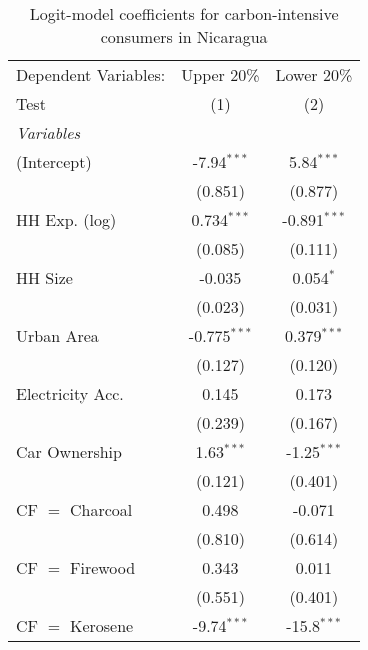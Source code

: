 
\begin{table}[htbp!]
   \centering
   \small
   \begin{adjustbox}{width = 1\textwidth, max height = 0.95\textheight, center}
      \begin{threeparttable}[b]
         \caption{\label{tab:Logit_1_NIC} Logit-model coefficients for carbon-intensive consumers in Nicaragua}
         \begin{tabular}{lcc}
            \tabularnewline \midrule \midrule
            Dependent Variables: & Upper 20\%     & Lower 20\%\\   
            Test                 & (1)            & (2)\\  
            \midrule
            \emph{Variables}\\
            (Intercept)          & -7.94$^{***}$  & 5.84$^{***}$\\   
                                 & (0.851)        & (0.877)\\   
            HH Exp. (log)        & 0.734$^{***}$  & -0.891$^{***}$\\   
                                 & (0.085)        & (0.111)\\   
            HH Size              & -0.035         & 0.054$^{*}$\\   
                                 & (0.023)        & (0.031)\\   
            Urban Area           & -0.775$^{***}$ & 0.379$^{***}$\\   
                                 & (0.127)        & (0.120)\\   
            Electricity Acc.     & 0.145          & 0.173\\   
                                 & (0.239)        & (0.167)\\   
            Car Ownership        & 1.63$^{***}$   & -1.25$^{***}$\\   
                                 & (0.121)        & (0.401)\\   
            CF $=$ Charcoal      & 0.498          & -0.071\\   
                                 & (0.810)        & (0.614)\\   
            CF $=$ Firewood      & 0.343          & 0.011\\   
                                 & (0.551)        & (0.401)\\   
            CF $=$ Kerosene      & -9.74$^{***}$  & -15.8$^{***}$\\   

\end{tabular}
\end{threeparttable}
\end{adjustbox}
\end{table}
